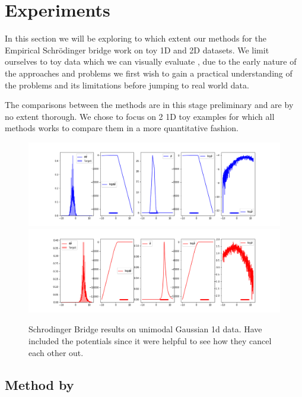 \documentclass[a4paper,12pt,twoside,openright]{report}
\theoremstyle{definition}
\begin{document}
\chapter{Experiments}

In this section we will be exploring to which extent our methods for the Empirical Schrödinger bridge work on toy 1D and 2D datasets. We limit ourselves to toy data which we can visually evaluate , due to the early nature of the approaches and problems we first wish to gain a practical understanding of the problems and its limitations before jumping to real world data. 

The comparisons between the methods are in this stage preliminary and are by no extent thorough. We chose to focus on 2 1D toy examples for which all methods works to compare them in a more quantitative fashion.
\begin{figure}[t]
    \centering
    \includegraphics[scale=0.42,trim={4.3cm 0.2cm 1.5cm 0}, clip]{images/Pavon/Forward_unimodal_working_pavon_relu_nn500.png}\\\vspace{-0.2cm}
    \includegraphics[scale=0.42,trim={4.3cm 0 1.5cm 1.5cm}, clip]{images/Pavon/Backward_unimodal_working_pavon_relu_nn500.png} 
    \caption{Schrodinger Bridge results on unimodal Gaussian 1d data. Have included the potentials since it  were helpful to see how they cancel each other out. }
    \label{fig:driftpavon}
\end{figure}
\section{Method by \cite{pavon2018data}}
\end{document}
